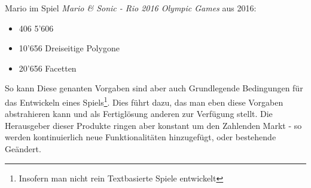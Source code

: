 Mario im Spiel \emph{Mario \& Sonic - Rio 2016 Olympic Games} aus 2016:
\begin{itemize}[noitemsep,topsep=0pt,parsep=0pt,partopsep=0pt]
	\item 406 5'606
	\item 10'656 Dreiseitige Polygone
	\item 20'656 Facetten
\end{itemize}

So kann  Diese genanten Vorgaben sind aber auch Grundlegende Bedingungen für das Entwickeln eines Spiels\footnote{Insofern man nicht rein Textbasierte Spiele entwickelt}. Dies führt dazu, das man eben diese Vorgaben abstrahieren kann und als Fertiglösung anderen zur Verfügung stellt. Die Herausgeber dieser Produkte ringen aber konstant um den Zahlenden Markt - so werden kontinuierlich neue Funktionalitäten hinzugefügt, oder bestehende Geändert. \\


